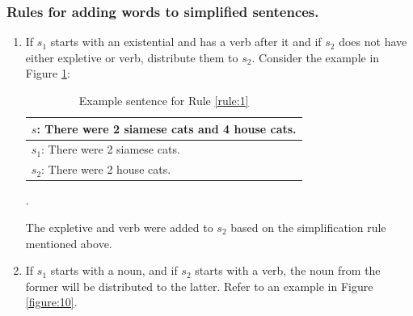 \documentclass[11pt]{article}
\begin{document}
\subsubsection{Rules for adding words to simplified sentences.}\label{sec:secondsentencesimplification}
\begin{enumerate}
\item \label{rule:1}
If \begin{math}s_{1}\end{math} starts with an existential and has a verb after it and if \begin{math}s_{2}\end{math} does not have either expletive or verb, distribute them to \begin{math}s_{2}\end{math}. Consider the example in Figure \ref{figure:9}:

\newpage
\begin{table}[h!]
\centering
\begin{tabular}{ | m{25em} | }
\hline
 \textbf{\begin{math}s\end{math}: There were 2 siamese cats and 4 house cats.}\\
\hline
\begin{math}s_{1}\end{math}: There were 2 siamese cats.\\
\hline
\begin{math}s_{2}\end{math}: There were 2 house cats.\\
\hline
\end{tabular}
\caption{Example sentence for Rule \ref{rule:1}}.
\label{figure:9}
\end{table}

The expletive and verb were added to \begin{math}s_{2}\end{math} based on the simplification rule mentioned above.

\item \label{rule:2}
If \begin{math}s_{1}\end{math} starts with a noun, and if \begin{math}s_{2}\end{math} starts with a verb, the noun from the former will be distributed to the latter. Refer to an example in Figure \ref{figure:10}.


\end{enumerate}
\end{document}
